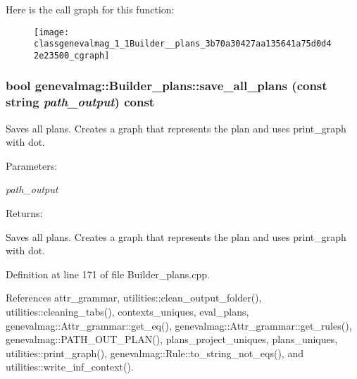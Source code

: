 Here is the call graph for this function:\nopagebreak
\begin{figure}[H]
\begin{center}
\leavevmode
\texttt{[image: classgenevalmag\_1\_1Builder\_\_plans\_3b70a30427aa135641a75d0d42e23500\_cgraph]}
\end{center}
\end{figure}
\hypertarget{classgenevalmag_1_1Builder__plans_a15ea4156613c75cfca5ecc0bd6a5193}{
\subsubsection[{save\_\-all\_\-plans}]{\setlength{\rightskip}{0pt plus 5cm}bool genevalmag::Builder\_\-plans::save\_\-all\_\-plans (const string {\em path\_\-output}) const}}
\label{classgenevalmag_1_1Builder__plans_a15ea4156613c75cfca5ecc0bd6a5193}


Saves all plans. Creates a graph that represents the plan and uses print\_\-graph with dot. \begin{Desc}
\item[Parameters:]
\begin{description}
\item[{\em path\_\-output}]\end{description}
\end{Desc}
\begin{Desc}
\item[Returns:]\end{Desc}
Saves all plans. Creates a graph that represents the plan and uses print\_\-graph with dot. 

Definition at line 171 of file Builder\_\-plans.cpp.

References attr\_\-grammar, utilities::clean\_\-output\_\-folder(), utilities::cleaning\_\-tabs(), contexts\_\-uniques, eval\_\-plans, genevalmag::Attr\_\-grammar::get\_\-eq(), genevalmag::Attr\_\-grammar::get\_\-rules(), genevalmag::PATH\_\-OUT\_\-PLAN(), plans\_\-project\_\-uniques, plans\_\-uniques, utilities::print\_\-graph(), genevalmag::Rule::to\_\-string\_\-not\_\-eqs(), and utilities::write\_\-inf\_\-context().

